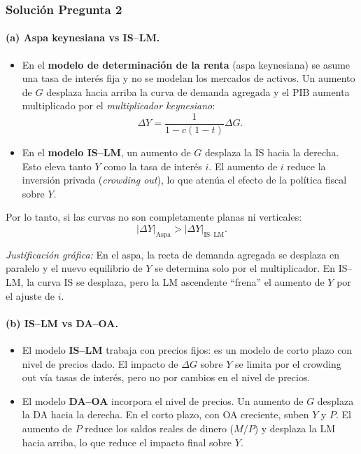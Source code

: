 \documentclass[11pt,addpoints]{article}
\begin{document}
\subsubsection*{Solución Pregunta 2}

\paragraph{(a) Aspa keynesiana vs IS--LM.}

\begin{itemize}
  \item En el \textbf{modelo de determinación de la renta} (aspa keynesiana) se asume una tasa de interés fija y no se modelan los mercados de activos. Un aumento de $G$ desplaza hacia arriba la curva de demanda agregada y el PIB aumenta multiplicado por el \emph{multiplicador keynesiano}:
  \[
  \Delta Y = \frac{1}{1 - c(1-t)} \Delta G.
  \]
  \item En el \textbf{modelo IS--LM}, un aumento de $G$ desplaza la IS hacia la derecha. Esto eleva tanto $Y$ como la tasa de interés $i$. El aumento de $i$ reduce la inversión privada (\emph{crowding out}), lo que atenúa el efecto de la política fiscal sobre $Y$.
\end{itemize}

Por lo tanto, si las curvas no son completamente planas ni verticales:
\[
\boxed{|\Delta Y|_{\text{Aspa}} > |\Delta Y|_{\text{IS--LM}}.}
\]

\emph{Justificación gráfica:}  
En el aspa, la recta de demanda agregada se desplaza en paralelo y el nuevo equilibrio de $Y$ se determina solo por el multiplicador. En IS--LM, la curva IS se desplaza, pero la LM ascendente ``frena'' el aumento de $Y$ por el ajuste de $i$.

\medskip

\paragraph{(b) IS--LM vs DA--OA.}

\begin{itemize}
  \item El modelo \textbf{IS--LM} trabaja con precios fijos: es un modelo de corto plazo con nivel de precios dado. El impacto de $\Delta G$ sobre $Y$ se limita por el crowding out vía tasas de interés, pero no por cambios en el nivel de precios.
  \item El modelo \textbf{DA--OA} incorpora el nivel de precios. Un aumento de $G$ desplaza la DA hacia la derecha. En el corto plazo, con OA creciente, suben $Y$ y $P$. El aumento de $P$ reduce los saldos reales de dinero ($M/P$) y desplaza la LM hacia arriba, lo que reduce el impacto final sobre $Y$.
\end{itemize}
\end{document}
